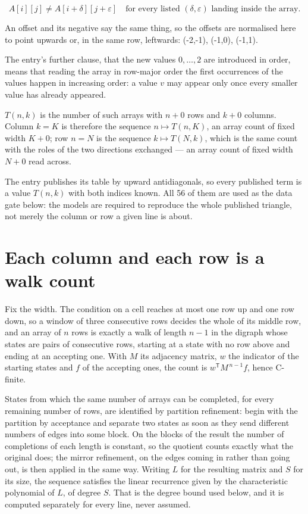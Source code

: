 \documentclass[11pt]{article}
\theoremstyle{definition}
\begin{document}
\[A[i][j] \ne A[i{+}\delta][j{+}\varepsilon]\quad\text{for every listed }(\delta,\varepsilon)\text{ landing inside the array.}\]

An offset and its negative say the same thing, so the offsets are normalised here to point upwards or, in the same row, leftwards: (-2,-1), (-1,0), (-1,1).

The entry's further clause, that the new values $0,\dots,2$ are introduced in order, means that reading the array in row-major order the first occurrences of the values happen in increasing order: a value $v$ may appear only once every smaller value has already appeared.

$T(n,k)$ is the number of such arrays with $n + 0$ rows and $k + 0$ columns. Column $k = K$ is therefore the sequence $n \mapsto T(n,K)$, an array count of fixed width $K + 0$; row $n = N$ is the sequence $k \mapsto T(N,k)$, which is the same count with the roles of the two directions exchanged --- an array count of fixed width $N + 0$ read across.

The entry publishes its table by upward antidiagonals, so every published term is a value $T(n,k)$ with both indices known. All 56 of them are used as the data gate below: the models are required to reproduce the whole published triangle, not merely the column or row a given line is about.

\section{Each column and each row is a walk count}

Fix the width. The condition on a cell reaches at most one row up and one row down, so a window of three consecutive rows decides the whole of its middle row, and an array of $n$ rows is exactly a walk of length $n-1$ in the digraph whose states are pairs of consecutive rows, starting at a state with no row above and ending at an accepting one. With $M$ its adjacency matrix, $w$ the indicator of the starting states and $f$ of the accepting ones, the count is $w^{\mathsf T}M^{\,n-1}f$, hence C-finite.

States from which the same number of arrays can be completed, for every remaining number of rows, are identified by partition refinement: begin with the partition by acceptance and separate two states as soon as they send different numbers of edges into some block. On the blocks of the result the number of completions of each length is constant, so the quotient counts exactly what the original does; the mirror refinement, on the edges coming in rather than going out, is then applied in the same way. Writing $L$ for the resulting matrix and $S$ for its size, the sequence satisfies the linear recurrence given by the characteristic polynomial of $L$, of degree $S$. That is the degree bound used below, and it is computed separately for every line, never assumed.
\end{document}
